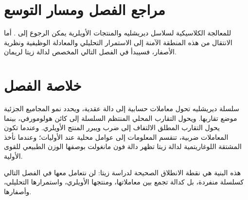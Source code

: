 \section{مراجع الفصل ومسار التوسع}

للمعالجة الكلاسيكية لسلاسل ديريشليه والمنتجات الأويلرية يمكن الرجوع إلى
\cite{Apostol1976,Davenport2000,Titchmarsh1986}. أما الانتقال من هذه
المنطقة الآمنة إلى الاستمرار التحليلي والمعادلة الوظيفية ونظرية الأصفار،
فسيبدأ في الفصل التالي المخصص لدالة زيتا لريمان.

\section{خلاصة الفصل}

سلسلة ديريشليه تحول معاملات حسابية إلى دالة عقدية، ويحدد نمو المجاميع
الجزئية موضع تقاربها. ويحول التقارب المحلي المنتظم السلسلة إلى كائن
هولومورفي، بينما يحول التقارب المطلق الالتفاف إلى ضرب ويبرر المنتج
الأويلري. وعندما تكون المعاملات ضربية، تنقسم المعلومات إلى عوامل محلية عند
الأوليات؛ وعندما نأخذ المشتقة اللوغاريتمية لدالة زيتا تظهر دالة فون
مانغولت بوصفها الوزن الطبيعي للقوى الأولية.

هذه البنية هي نقطة الانطلاق الصحيحة لدراسة زيتا: لن نتعامل معها في الفصل
التالي كسلسلة منفردة، بل كدالة تجمع بين معاملاتها، ومنتجها الأويلري،
واستمرارها التحليلي، وأصفارها.
